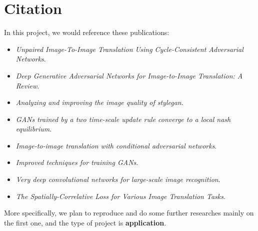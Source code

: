 \section{Citation}

In this project, we would reference these publications:
\begin{itemize}
    \item \textit{Unpaired Image-To-Image Translation Using Cycle-Consistent Adversarial Networks}\cite{zhu_unpaired_2017}.
    \item \textit{Deep Generative Adversarial Networks for Image-to-Image Translation: A Review}\cite{sym12101705}.
    \item \textit{Analyzing and improving the image quality of stylegan}\cite{karras2020analyzing}.
    \item \textit{GANs trained by a two time-scale update rule converge to a local nash equilibrium}\cite{heusel2017gans}.
    \item \textit{Image-to-image translation with conditional adversarial networks}\cite{isola2017image}.
    \item \textit{Improved techniques for training GANs}\cite{salimans2016improved}.
    \item \textit{Very deep convolutional networks for large-scale image recognition}\cite{simonyan2014very}.
    \item \textit{The Spatially-Correlative Loss for Various Image Translation Tasks}\cite{chuanxia2021the}.
\end{itemize}

More specifically, we plan to reproduce and
do some further researches mainly on the first one,
and the type of project is \textbf{application}.
